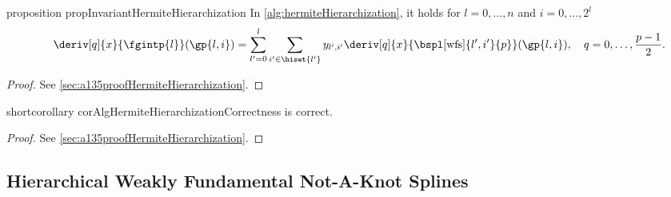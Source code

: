 \begin{restatable}{%
  proposition%
}{%
  propInvariantHermiteHierarchization%
}
  \label{prop:invariantHermiteHierarchization}
  In \cref{alg:hermiteHierarchization}, it holds
  for $l = 0, \dotsc, n$ and $i = 0, \dotsc, 2^l$
  \begin{equation}
    \label{eq:propInvariantHermiteHierarchization}
    \deriv[q]{x}{\fgintp{l}}(\gp{l,i})
    = \sum_{l'=0}^l \sum_{i' \in \hiset{l'}}
    \linout{l',i'} \deriv[q]{x}{\bspl[\wfs]{l',i'}{p}}(\gp{l,i}),\quad
    q = 0, \dotsc, \frac{p-1}{2}.
    \hspace*{-6mm}
  \end{equation}
\end{restatable}

\begin{proof}
  See \cref{sec:a135proofHermiteHierarchization}.
\end{proof}

\begin{restatable}{%
  shortcorollary%
}{%
  corAlgHermiteHierarchizationCorrectness%
}
  \label{cor:algHermiteHierarchizationCorrectness}
   is correct.
\end{restatable}

\begin{proof}
  See \cref{sec:a135proofHermiteHierarchization}.
\end{proof}



\subsection{Hierarchical Weakly Fundamental Not-A-Knot Splines}
\label{sec:456wfsNotAKnot}

